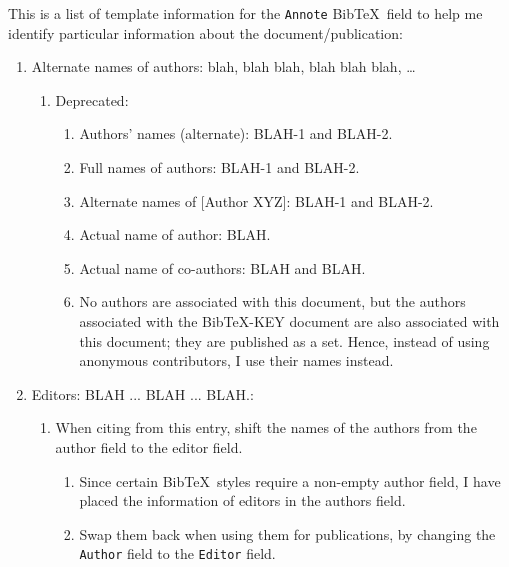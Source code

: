 \documentclass[letter,12pt]{article}
\begin{document}
This is a list of template information for the {\tt Annote} {\sc Bib}\TeX\ field to help me identify particular information about the document/publication: \vspace{-0.3cm}
\begin{enumerate} \itemsep -4pt
\item Alternate names of authors: blah, blah blah, blah blah blah, \dots \vspace{-0.3cm}
	\begin{enumerate} \itemsep -2pt
	\item Deprecated: \vspace{-0.2cm}
		\begin{enumerate} \itemsep -2pt
		\item Authors' names (alternate): BLAH-1 and BLAH-2.
		\item Full names of authors: BLAH-1 and BLAH-2.
		\item Alternate names of $[$Author XYZ$]$: BLAH-1 and BLAH-2.
		\item Actual name of author: BLAH.
		\item Actual name of co-authors: BLAH and BLAH.
		\item No authors are associated with this document, but the authors associated with the BibTeX-KEY document are also associated with this document; they are published as a set. Hence, instead of using anonymous contributors, I use their names instead.
		\end{enumerate}
	\end{enumerate}
\item Editors: BLAH ... BLAH ... BLAH.: \vspace{-0.3cm}
	\begin{enumerate} \itemsep -2pt
	\item When citing from this entry, shift the names of the authors from the author field to the editor field. \vspace{-0.2cm}
		\begin{enumerate} \itemsep -2pt
		\item Since certain {\sc Bib}\TeX\ styles require a non-empty author field, I have placed the information of editors in the authors field. 
		\item Swap them back when using them for publications, by changing the {\tt Author} field to the {\tt Editor} field.
		\end{enumerate}

\end{enumerate}
\end{enumerate}
\end{document}
